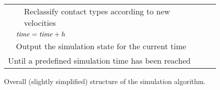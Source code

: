 \begin{figure}
\begin{tabular}{|l|l|l|l|@{}l}
        &&\multicolumn{2}{|l|}{Reclassify contact types according to new velocities}\\\cline{2-4}
    &\multicolumn{3}{|l|}{$\mbox{\textit{time}} = \mbox{\textit{time}} + h$}\\\cline{2-4}
    &\multicolumn{3}{|l|}{Output the simulation state for the current time}\\\cline{2-4}
\multicolumn{4}{|l|}{Until a predefined simulation time has been reached}\\\cline{1-4}
\end{tabular}
\caption{Overall (slightly simplified) structure of the simulation algorithm.}
\end{figure}
